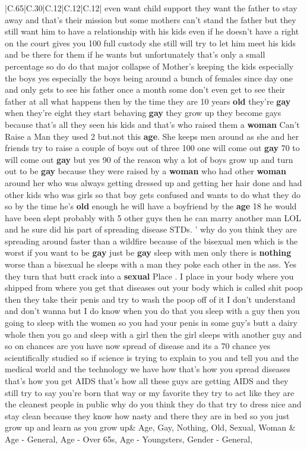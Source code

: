 \documentclass[11pt]{article}
\newlength\mylength
\begin{document}
\begin{center}
\begin{longtable}{|C{.65\mylength}|C{.30\mylength}|C{.12\mylength}|C{.12\mylength}|C{.12\mylength}|}
even want child support they want the father to stay away and that's their mission but some mothers can't stand the father but they still want him to have a relationship with his kids even if he doesn't have a right on the court gives you 100 full custody she still will try to let him meet his kids and be there for them if he wants but unfortunately that's only a small percentage so do do that major collapse of Mother's keeping the kids especially the boys yes especially the boys being around a bunch of females since day one and only gets to see his father once a month some don't even get to see their father at all what happens then by the time they are 10 years \textbf{old} they're \textbf{g\textbf{ay}} when they're eight they start behaving \textbf{g\textbf{ay}} they grow up they become gays because that's all they seen his kids and that's who raised them a \textbf{woman} Can't Raise a Man they used 2 but.not this \textbf{age}. She keeps men around as she and her friends try to raise a couple of boys out of three 100 one will come out \textbf{g\textbf{ay}} 70 to will come out \textbf{g\textbf{ay}} but yes  90 of the reason why a lot of boys grow up and turn out to be \textbf{g\textbf{ay}} because they were raised by a \textbf{woman} who had other \textbf{woman} around her who was always getting dressed up and getting her hair done and had other kids who was girls so that boy gets confused and wants to do what they do so by the time he's \textbf{old} enough he will have a boyfriend by the \textbf{age} 18 he would have been slept probably with 5 other guys then he can marry another man LOL and he sure did his part of spreading disease STDs. ' why do you think they are spreading around faster than a wildfire because of the bisexual men which is the worst if you want to be \textbf{g\textbf{ay}} just be \textbf{g\textbf{ay}} sleep with men only there is \textbf{nothing} worse than a bisexual he sleeps with a man they poke each other in the ass. Yes they turn that butt crack into a \textbf{sexual} Place . I place in your body where you shipped from where you get that diseases out your body which is called shit poop then they take their penis and try to wash the poop off of it I don't understand and don't wanna but I do know when you do that you sleep with a guy then you going to sleep with the women so you had your penis in some guy's butt a dairy whole then you go and sleep with a girl then the girl sleeps with another guy and so on chances are you have now spread of disease and its a 70 chance yes scientifically studied so if science is trying to explain to you and tell you and the medical world and the technology we have how that's how you spread diseases that's how you get AIDS that's how all these guys are getting AIDS and they still try to say you're born that way or my favorite they try to act like they are the cleanest people in public why do you think they do that try to dress nice and stay clean because they know how nasty and there they are in bed so you just grow up and learn as you grow up\normalsize   & Age, Gay, Nothing, Old, Sexual, Woman & Age - General, Age - Over 65s, Age - Youngsters, Gender - General, 
\end{longtable}
\end{center}
\end{document}
